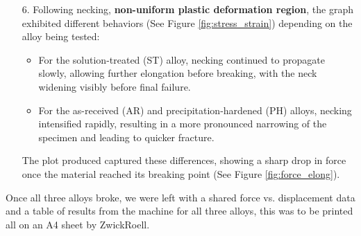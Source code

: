 \documentclass{article}
\begin{document}
\newpage
\begin{enumerate}
    \item[6.] Following necking, \textbf{non-uniform plastic deformation region}, the graph exhibited different behaviors (See Figure \ref{fig:stress_strain}) depending on the alloy being tested:
    \begin{itemize}
        \item For the solution-treated (ST) alloy, necking continued to propagate slowly, allowing further elongation before breaking, with the neck widening visibly before final failure.
        \item For the as-received (AR) and precipitation-hardened (PH) alloys, necking intensified rapidly, resulting in a more pronounced narrowing of the specimen and leading to quicker fracture.
    \end{itemize}
    The plot produced captured these differences, showing a sharp drop in force once the material reached its breaking point (See Figure \ref{fig:force_elong}).
\end{enumerate}
Once all three alloys broke, we were left with a shared force vs. displacement data and a table of results from the machine for all three alloys, this was to be printed all on an A4 sheet by ZwickRoell.\\ 
\vspace{3em}
\end{document}
